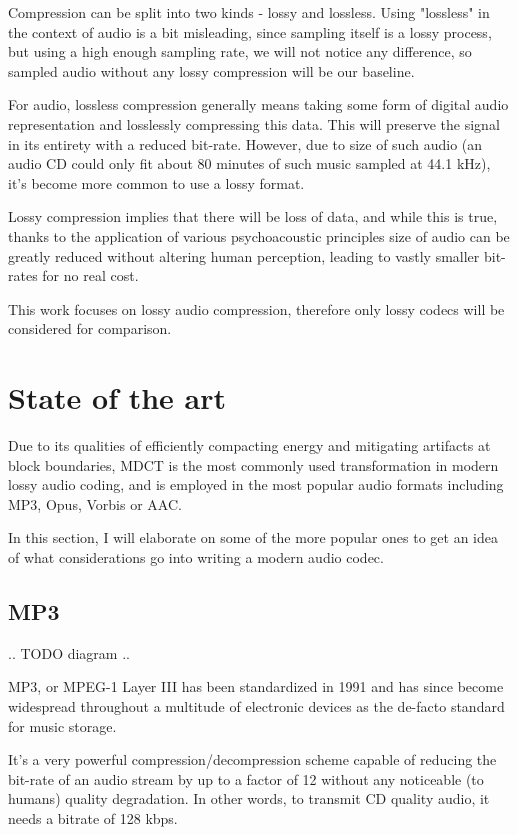 Compression can be split into two kinds - lossy and lossless. Using "lossless" in the context of audio is a bit misleading, since sampling itself is a lossy process, but using a high enough sampling rate, we will not notice any difference, so sampled audio without any lossy compression will be our baseline.

For audio, lossless compression generally means taking some form of digital audio representation and losslessly compressing this data. This will preserve the signal in its entirety with a reduced bit-rate. However, due to size of such audio (an audio CD could only fit about 80 minutes of such music sampled at 44.1 kHz), it's become more common to use a lossy format.

Lossy compression implies that there will be loss of data, and while this is true, thanks to the application of various psychoacoustic principles size of audio can be greatly reduced without altering human perception, leading to vastly smaller bit-rates for no real cost.

This work focuses on lossy audio compression, therefore only lossy codecs will be considered for comparison.

\section{State of the art}
Due to its qualities of efficiently compacting energy and mitigating artifacts at block boundaries, MDCT is the most commonly used transformation in modern lossy audio coding, and is employed in the most popular audio formats including MP3, Opus, Vorbis or AAC.

In this section, I will elaborate on some of the more popular ones to get an idea of what considerations go into writing a modern audio codec.

\subsection{MP3}
.. TODO diagram ..

MP3, or MPEG-1 Layer III has been standardized in 1991 and has since become widespread throughout a multitude of electronic devices as the de-facto standard for music storage.

It's a very powerful compression/decompression scheme capable of reducing the bit-rate of an audio stream by up to a factor of 12 without any noticeable (to humans) quality degradation. In other words, to transmit CD quality audio, it needs a bitrate of 128 kbps. \cite{Raissi2002TheTB}

